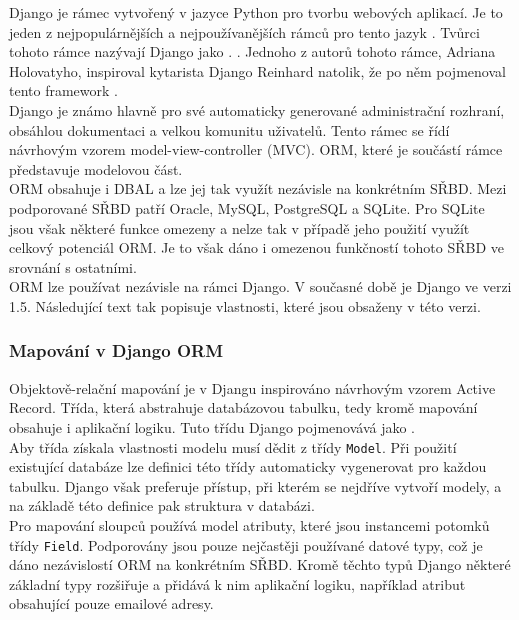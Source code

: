 \documentclass[ing,male,java,dept456]{diploma}						%
\begin{document}
Django je rámec vytvořený v jazyce Python pro tvorbu webových aplikací. Je to jeden z nejpopulárnějších a nejpoužívanějších rámců pro tento jazyk \cite{pwiki}. Tvůrci tohoto rámce nazývají Django jako .  \cite{django.cz}. Jednoho z autorů tohoto rámce, Adriana Holovatyho, inspiroval kytarista Django Reinhard natolik, že po něm pojmenoval tento framework \cite{aholovaty}.  \\

Django je známo hlavně pro své automaticky generované administrační rozhraní, obsáhlou dokumentaci a velkou komunitu uživatelů. Tento rámec se řídí návrhovým vzorem model-view-controller (MVC). ORM, které je součástí rámce představuje modelovou část. \\ 
ORM obsahuje i DBAL a lze jej tak využít nezávisle na konkrétním SŘBD. Mezi podporované SŘBD patří Oracle, MySQL, PostgreSQL a SQLite. Pro SQLite jsou však některé funkce omezeny a nelze tak v případě jeho použití využít celkový potenciál ORM. Je to však dáno i omezenou funkčností tohoto SŘBD ve srovnání s ostatními. \\
ORM lze používat nezávisle na rámci Django. V současné době je Django ve verzi 1.5. Následující text tak popisuje vlastnosti, které jsou obsaženy v této verzi.

\subsubsection{Mapování v Django ORM}

Objektově-relační mapování je v Djangu inspirováno návrhovým vzorem Active Record. Třída, která abstrahuje databázovou tabulku, tedy kromě mapování obsahuje i aplikační logiku. Tuto třídu Django pojmenovává jako . \\
Aby třída získala vlastnosti modelu musí dědit z třídy \lstinline[style=custompython]|Model|. Při použití existující databáze lze definici této třídy automaticky vygenerovat pro každou tabulku. Django však preferuje přístup, při kterém se nejdříve vytvoří modely, a na základě této definice pak struktura v databázi. \\
Pro mapování sloupců používá model atributy, které jsou instancemi potomků třídy \lstinline[style=custompython]|Field|. Podporovány jsou pouze nejčastěji používané datové typy, což je dáno nezávislostí ORM na konkrétním SŘBD. Kromě těchto typů Django některé základní typy rozšiřuje a přidává k nim aplikační logiku, například atribut obsahující pouze emailové adresy. \\
\end{document}
